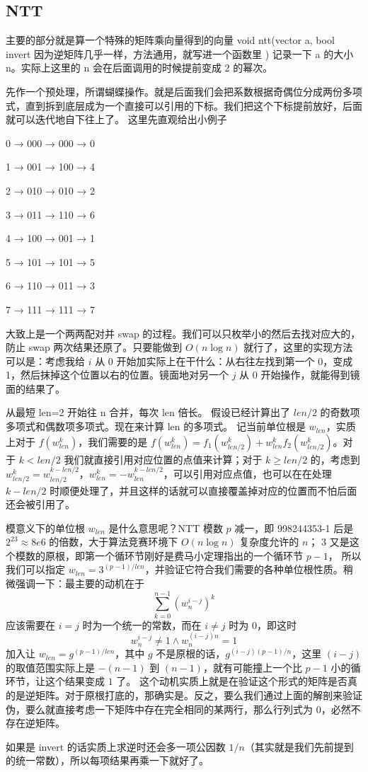 \subsection{NTT}

主要的部分就是算一个特殊的矩阵乘向量得到的向量
void ntt(vector a, bool invert 因为逆矩阵几乎一样，方法通用，就写进一个函数里 )
记录一下 a 的大小 n。实际上这里的 n 会在后面调用的时候提前变成 2 的幂次。

先作一个预处理，所谓蝴蝶操作。就是后面我们会把系数根据奇偶位分成两份多项式，直到拆到底层成为一个直接可以引用的下标。我们把这个下标提前放好，后面就可以迭代地自下往上了。
这里先直观给出小例子

0 → 000 → 000 → 0  

1 → 001 → 100 → 4  

2 → 010 → 010 → 2  

3 → 011 → 110 → 6  

4 → 100 → 001 → 1  

5 → 101 → 101 → 5  

6 → 110 → 011 → 3  

7 → 111 → 111 → 7

大致上是一个两两配对并 swap 的过程。我们可以只枚举小的然后去找对应大的，防止 swap 两次结果还原了。只要能做到 $O(n\log n)$ 就行了，这里的实现方法可以是：考虑我给 $i$ 从 $0$ 开始加实际上在干什么：从右往左找到第一个 0，变成 1，然后抹掉这个位置以右的位置。镜面地对另一个 $j$ 从 $0$ 开始操作，就能得到镜面的结果了。

从最短 len=2 开始往 n 合并，每次 len 倍长。
假设已经计算出了 $len/2$ 的奇数项多项式和偶数项多项式。现在来计算 len 的多项式。
记当前单位根是 $w_{len}$，实质上对于 $f(w_{len}^{k})$，我们需要的是 $f(w_{len}^{k}) = f_1(w_{len/2}^{k}) +w_{len}^{k}f_2(w_{len/2}^{k})$。对于 $k<len/2$ 我们就直接引用对应位置的点值来计算；对于 $k\ge len/2$ 的，考虑到 $w_{len/2}^{k} = w_{len/2}^{k-len/2}$，$w_{len}^{k} = -w_{len}^{k-len/2}$，可以引用对应点值，也可以在在处理 $k-len/2$ 时顺便处理了，并且这样的话就可以直接覆盖掉对应的位置而不怕后面还会被引用了。

模意义下的单位根 $w_{len}$ 是什么意思呢？NTT 模数 $p$ 减一，即 998244353-1 后是 $2^{23}\approx 8e6$ 的倍数，大于算法竞赛环境下 $O(n\log n)$ 复杂度允许的 $n$；
$3$ 又是这个模数的原根，即第一个循环节刚好是费马小定理指出的一个循环节 $p-1$，
所以我们可以指定 $w_{len} = 3^{(p-1)/len}$，并验证它符合我们需要的各种单位根性质。稍微强调一下：最主要的动机在于
$$
\sum_{k=0}^{n-1}(w_n^{i-j})^{k}
$$
应该需要在 $i=j$ 时为一个统一的常数，而在 $i\not=j$ 时为 $0$，即这时
$$
w_{n}^{i-j}\not= 1 \land w_{n}^{(i-j)n}=1
$$
加入让 $w_{len}=g^{(p-1)/len}$，其中 $g$ 不是原根的话，$g^{(i-j)(p-1)/n}$，这里 $(i-j)$ 的取值范围实际上是 $-(n-1)$ 到 $(n-1)$，就有可能撞上一个比 $p-1$ 小的循环节，让这个结果变成 $1$ 了。
这个动机实质上就是在验证这个形式的矩阵是否真的是逆矩阵。对于原根打底的，那确实是。反之，要么我们通过上面的解剖来验证伪，要么就直接考虑一下矩阵中存在完全相同的某两行，那么行列式为 $0$，必然不存在逆矩阵。


如果是 invert 的话实质上求逆时还会多一项公因数 $1/n$（其实就是我们先前提到的统一常数），所以每项结果再乘一下就好了。

